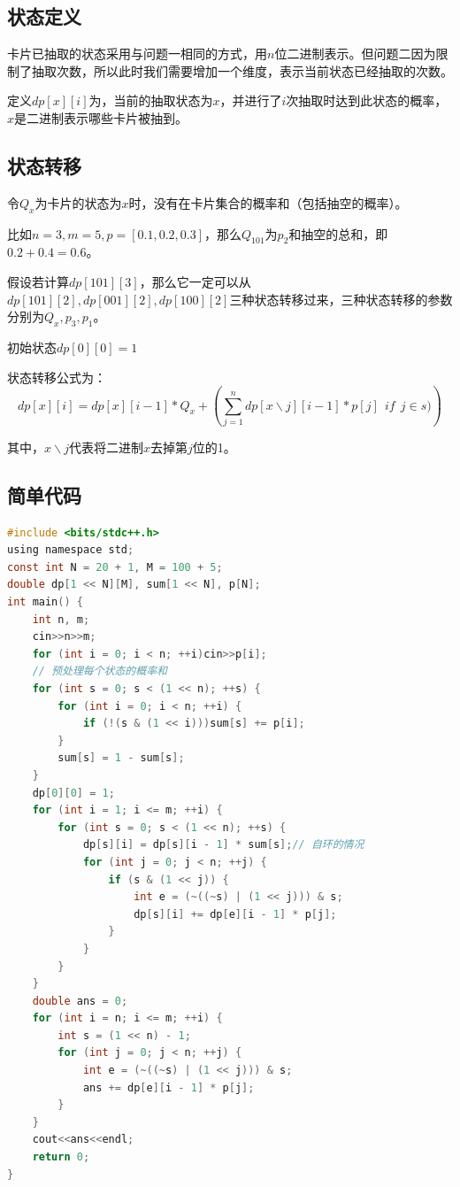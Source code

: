 \documentclass[master]{thesis-uestc}
\begin{document}
\subsection{状态定义}

卡片已抽取的状态采用与问题一相同的方式，用$n$位二进制表示。但问题二因为限制了抽取次数，所以此时我们需要增加一个维度，表示当前状态已经抽取的次数。

定义$dp[x][i]$为，当前的抽取状态为$x$，并进行了$i$次抽取时达到此状态的概率，$x$是二进制表示哪些卡片被抽到。

\subsection{状态转移}

令$Q_x$为卡片的状态为$x$时，没有在卡片集合的概率和（包括抽空的概率）。

比如$n=3,m=5,p=[0.1,0.2,0.3]$，那么$Q_{101}$为$p_2$和抽空的总和，即$0.2+0.4=0.6$。

假设若计算$dp[101][3]$，那么它一定可以从$dp[101][2],dp[001][2],dp[100][2]$三种状态转移过来，三种状态转移的参数分别为$Q_x,p_3,p_1$。

初始状态$dp[0][0]=1$

状态转移公式为：
$$
dp[x][i]=dp[x][i-1]*{Q_x}+(\sum\limits_{j=1}^{n}{dp[x \backslash j][i-1]*p[j]\ \ if\ \  j\in s)})
$$

其中，$x \backslash j$代表将二进制$x$去掉第$j$位的1。

\subsection{简单代码}


\begin{lstlisting}[frame=shadowbox,language=C] 
#include <bits/stdc++.h>
using namespace std;
const int N = 20 + 1, M = 100 + 5;
double dp[1 << N][M], sum[1 << N], p[N];
int main() {
    int n, m;
    cin>>n>>m;
    for (int i = 0; i < n; ++i)cin>>p[i];
    // 预处理每个状态的概率和
    for (int s = 0; s < (1 << n); ++s) {
        for (int i = 0; i < n; ++i) {
            if (!(s & (1 << i)))sum[s] += p[i];
        }
        sum[s] = 1 - sum[s];
    }
    dp[0][0] = 1;
    for (int i = 1; i <= m; ++i) {
        for (int s = 0; s < (1 << n); ++s) {
            dp[s][i] = dp[s][i - 1] * sum[s];// 自环的情况
            for (int j = 0; j < n; ++j) {
                if (s & (1 << j)) {
                    int e = (~((~s) | (1 << j))) & s;
                    dp[s][i] += dp[e][i - 1] * p[j];
                }
            }
        }
    }
    double ans = 0;
    for (int i = n; i <= m; ++i) {
        int s = (1 << n) - 1;
        for (int j = 0; j < n; ++j) {
            int e = (~((~s) | (1 << j))) & s;
            ans += dp[e][i - 1] * p[j];
        }
    }
    cout<<ans<<endl;
    return 0;
}
    \end{lstlisting} 
\end{document}
